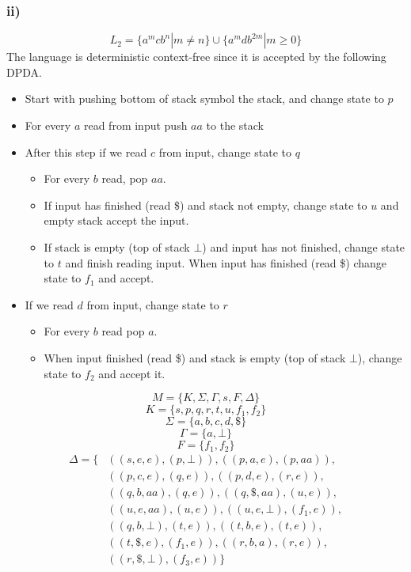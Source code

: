 \documentclass[12pt]{article}
\begin{document}
\subsubsection*{ii)} $$L_2 = \{a^mcb^n | m \neq n\} \cup \{a^mdb^{2m} | m \geq 0\}$$
The language is deterministic context-free since it is accepted by the following DPDA.
\begin{itemize}
    \item Start with pushing bottom of stack symbol the stack, and change state to $p$
    \item For every $a$ read from input push $aa$ to the stack
    \item After this step if we read $c$ from input, change state to $q$
    \begin{itemize}
        \item For every $b$ read, pop $aa$. 
        \item If input has finished (read \$) and stack not empty, change state to $u$ and empty stack accept the input.
        \item If stack is empty (top of stack $\bot$) and input has not finished, change state to $t$ and finish reading input. When input has finished (read \$) change state to $f_1$ and accept.
    \end{itemize}
    \item If we read $d$ from input, change state to $r$
    \begin{itemize}
        \item For every $b$ read pop $a$. 
        \item When input finished (read \$) and stack is empty (top of stack $\bot$), change state to $f_2$ and accept it. 
    \end{itemize}
\end{itemize}

$$M = \{K, \Sigma, \Gamma, s, F, \Delta\}$$
$$K = \{s,p,q,r,t,u,f_1,f_2\}$$
$$\Sigma = \{a,b,c,d,\$\}$$
$$\Gamma = \{a, \bot\}$$
$$F = \{f_1, f_2\}$$
\begin{equation*}
    \begin{split}
        \Delta = \{&((s,e,e),(p,\bot)), ((p,a,e),(p,aa)),\\
                   &((p,c,e),(q,e)), ((p,d,e),(r,e)),\\
                   &((q,b,aa),(q,e)), ((q,\$,aa),(u,e)),\\
                   &((u,e,aa),(u,e)), ((u,e,\bot),(f_1,e)),\\
                   &((q,b,\bot),(t,e)), ((t,b,e),(t,e)),\\
                   &((t,\$,e),(f_1,e)), ((r,b,a),(r,e)),\\
                   &((r,\$,\bot),(f_3,e))
                    \}
    \end{split}
\end{equation*}
\end{document}
